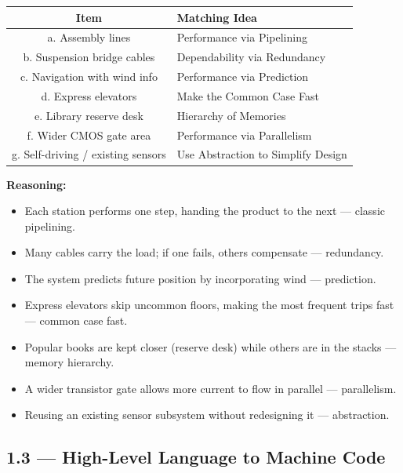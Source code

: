 \begin{center}
\begin{tabular}{cl}
\toprule
\textbf{Item} & \textbf{Matching Idea} \\
\midrule
a. Assembly lines              & Performance via Pipelining \\
b. Suspension bridge cables    & Dependability via Redundancy \\
c. Navigation with wind info   & Performance via Prediction \\
d. Express elevators           & Make the Common Case Fast \\
e. Library reserve desk        & Hierarchy of Memories \\
f. Wider CMOS gate area        & Performance via Parallelism \\
g. Self-driving / existing sensors & Use Abstraction to Simplify Design \\
\bottomrule
\end{tabular}
\end{center}

\textbf{Reasoning:}
\begin{itemize}
  \item[a.] Each station performs one step, handing the product to the next
        --- classic pipelining.
  \item[b.] Many cables carry the load; if one fails, others compensate
        --- redundancy.
  \item[c.] The system predicts future position by incorporating wind
        --- prediction.
  \item[d.] Express elevators skip uncommon floors, making the most frequent
        trips fast --- common case fast.
  \item[e.] Popular books are kept closer (reserve desk) while others are in
        the stacks --- memory hierarchy.
  \item[f.] A wider transistor gate allows more current to flow in parallel
        --- parallelism.
  \item[g.] Reusing an existing sensor subsystem without redesigning it
        --- abstraction.
\end{itemize}

\subsection*{1.3 --- High-Level Language to Machine Code}
\hypertarget{sol-1.3}{}

